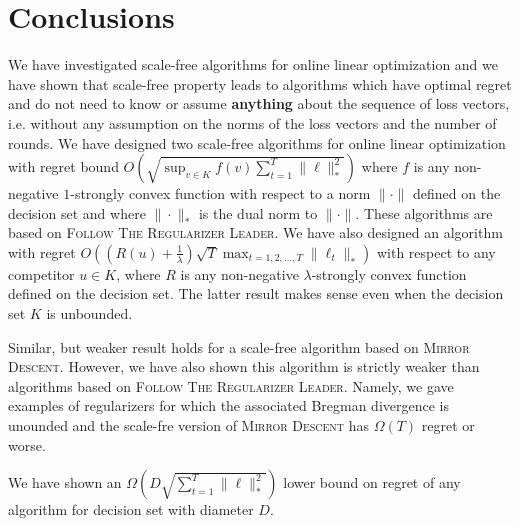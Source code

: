 \section{Conclusions}
\label{section:conclusions}

We have investigated scale-free algorithms for online linear optimization and
we have shown that scale-free property leads to algorithms which have optimal
regret and do not need to know or assume \textbf{anything} about the sequence
of loss vectors, i.e. without any assumption on the norms of the loss vectors
and the number of rounds. We have designed two scale-free algorithms for online linear
optimization with regret bound $O \left(\sqrt{\sup_{v \in K} f(v) \sum_{t=1}^T
\|\ell\|_*^2} \right)$ where $f$ is any non-negative $1$-strongly convex
function with respect to a norm $\|\cdot\|$ defined on the decision set and
where $\|\cdot\|_*$ is the dual norm to $\|\cdot\|$.  These algorithms are
based on \textsc{Follow The Regularizer Leader}.  We have also designed an
algorithm with regret $O\left((R(u) + \frac{1}{\lambda}) \sqrt{T}
\max_{t=1,2,\dots,T} \|\ell_t\|_* \right)$ with respect to any competitor $u
\in K$, where $R$ is any non-negative $\lambda$-strongly convex function
defined on the decision set.  The latter result makes sense even when the
decision set $K$ is unbounded.

Similar, but weaker result holds for a scale-free algorithm based on
\textsc{Mirror Descent}. However, we have also shown this algorithm is strictly
weaker than algorithms based on \textsc{Follow The Regularizer Leader}. Namely,
we gave examples of regularizers for which the associated Bregman divergence is
unounded and the scale-fre version of \textsc{Mirror Descent} has $\Omega(T)$
regret or worse.

We have shown an $\Omega\left( D \sqrt{\sum_{t=1}^T \|\ell\|_*^2}\right)$
lower bound on regret of any algorithm for decision set with diameter $D$.
